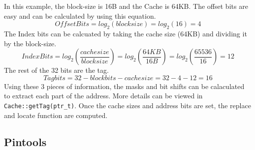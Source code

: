 \documentclass{article}
\begin{document}
			In this example, the block-size is 16B and the Cache is 64KB. The offset bits are easy and can be calculated by using this equation.
			\[ Offset Bits = log_2(blocksize) = log_2(16) = 4  \]
			The Index bits can be calcuated by taking the cache size (64KB) and dividing it by the block-size.
			\[ Index Bits = log_2\left(\frac{cachesize}{blocksize}\right) = log_2\left(\frac{64KB}{16B}\right) = log_2\left(\frac{65536}{16}\right) = 12 \]
			The rest of the 32 bits are the tag.
			\[ Tag bits = 32 - blockbits - cachesize = 32 - 4 - 12 = 16 \]
			Using these 3 pieces of information, the masks and bit shifts can be calaculated to extract each part of the address. More details can be viewed in \verb|Cache::getTag(ptr_t)|. Once the cache sizes and address bits are set, the replace and locate function are computed.


	\subsection{Pintools}
\end{document}
